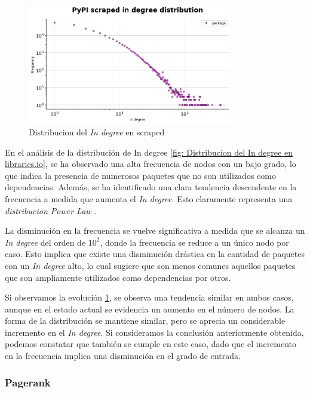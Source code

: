 \begin{figure}[h!]
    \begin{center}
        \includegraphics[width=0.8\textwidth]{img/pypi/ind_scraped_dist.png}
        \caption{Distribucion del \textit{In degree} en scraped}
        \label{fig: Distribucion del In degree en scraped}
    \end{center}
\end{figure}

En el análisis de la distribución de In degree \ref{fig: Distribucion del In degree en libraries.io},
se ha observado una alta frecuencia de nodos con un bajo grado,
lo que indica la presencia de numerosos paquetes que no son utilizados como dependencias. Además, se ha identificado
una clara tendencia descendente en la frecuencia a medida que aumenta el \textit{In degree}.
Esto claramente representa una \textit{distribucion Power Law} \cite{enwiki:1160892030}.

La disminución en la frecuencia se vuelve significativa a medida que se alcanza un \textit{In degree} del orden
de $10^2$, donde la frecuencia se reduce a un único nodo por caso. Esto implica que existe una disminución drástica
en la cantidad de paquetes con un \textit{In degree} alto, lo cual sugiere que son menos comunes aquellos paquetes
que son ampliamente utilizados como dependencias por otros.

Si observamos la evolución \ref{fig: Distribucion del In degree en scraped}, se observa una tendencia similar en ambos casos, aunque en el estado actual se evidencia
un aumento en el número de nodos. La forma de la distribución se mantiene similar, pero se aprecia un considerable
incremento en el \textit{In degree}. Si consideramos la conclusión anteriormente obtenida, podemos constatar que
también se cumple en este caso, dado que el incremento en la frecuencia implica una disminución en el grado de
entrada.

\subsubsection{Pagerank}

